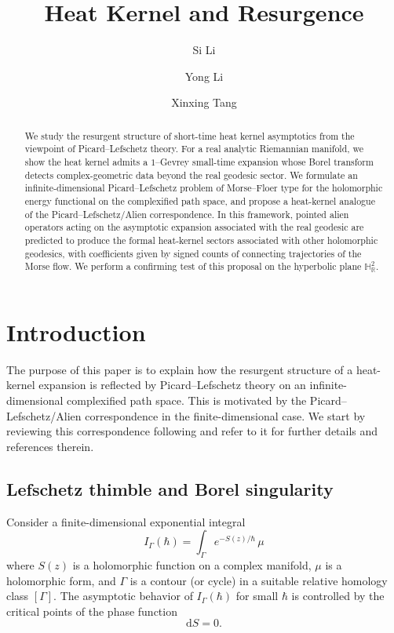 \documentclass[11pt]{amsart}
\title[Heat Kernel and Resurgence]{Heat Kernel and Resurgence}
\author[Si Li]{Si Li}
\author[Yong Li]{Yong Li}
\author[Xinxing Tang]{Xinxing Tang}
\date{}
\theoremstyle{plain}
\theoremstyle{definition}
\newcommand{\R}{\mathbb{R}}
\newcommand{\dd}{\mathrm d}
\begin{document}
\begin{abstract}
We study the resurgent structure of short-time heat kernel asymptotics from the viewpoint of Picard–Lefschetz theory. For a real analytic Riemannian manifold, we show the heat kernel admits a $1$--Gevrey small-time expansion whose Borel transform detects complex-geometric data beyond the real geodesic sector. We formulate an infinite-dimensional Picard–Lefschetz problem of Morse–Floer type for the holomorphic energy functional on the complexified path space, and propose a heat-kernel analogue of the Picard–Lefschetz/Alien correspondence. In this framework, pointed alien operators acting on the asymptotic expansion associated with the real geodesic are predicted to produce the formal heat-kernel sectors associated with other holomorphic geodesics, with coefficients given by signed counts of connecting trajectories of the Morse flow. We perform a confirming test of this proposal on the hyperbolic plane $\mathbb{H}_{\R}^2$.
\end{abstract}
\maketitle
\tableofcontents

\section{Introduction}

The purpose of this paper is to explain how the resurgent structure of a heat-kernel expansion is reflected by Picard--Lefschetz theory on an infinite-dimensional complexified path space. This is motivated by the Picard–Lefschetz/Alien correspondence in the finite-dimensional case. We start by reviewing this correspondence following \cite{LiLiTang2026}  and refer to it for further details and references therein. 

\subsection{Lefschetz thimble and Borel singularity}\label{sec:intro-Borel}
Consider a finite-dimensional exponential integral
\begin{equation*}
I_\Gamma(\hbar)=\int_\Gamma e^{-S(z)/\hbar}\,\mu
\end{equation*}
where $S(z)$ is a holomorphic function on a complex manifold, $\mu$ is a holomorphic form, and $\Gamma$ is a contour (or cycle) in a suitable relative homology class $[\Gamma]$. The asymptotic behavior of $I_\Gamma(\hbar)$ for small $\hbar$ is controlled by the critical points of the phase function
$$\dd S=0.$$
\end{document}
